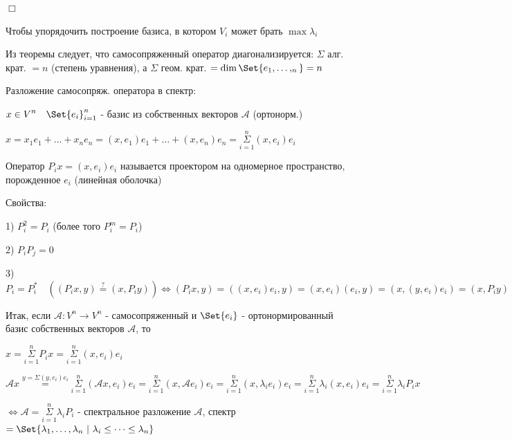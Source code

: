 \documentclass[12pt]{article}
\begin{document}
    $\Box$

    \Nota Чтобы упорядочить построение базиса, в котором $\displaystyle V_i$ может брать $\displaystyle \max \lambda_i$

    \Nota Из теоремы следует, что самосопряженный оператор диагонализируется: $\Sigma$ алг. крат. $ = n$ (степень уравнения), а $\Sigma$ геом. крат. $\displaystyle = \dim \Set{e_1, \dots, _n} = n$


    Разложение самосопряж. оператора в спектр:

    $\displaystyle x \in V^n \quad \Set{e_i}_{i=1}^n$ - базис из собственных векторов $\mathcal{A}$ (ортонорм.)

    $\displaystyle x = x_1 e_1 + \dots + x_n e_n = (x, e_1) e_1 + \dots + (x, e_n) e_n = \overset{n}{\underset{i = 1}{\Sigma}} (x, e_i) e_i$

    \Def Оператор $\displaystyle P_i x = (x, e_i) e_i$ называется проектором на одномерное пространство, порожденное $\displaystyle e_i$ (линейная оболочка)

    Свойства:

    1) $\displaystyle P_i^2 = P_i$ (более того $\displaystyle P^m_i = P_i$)

    2) $\displaystyle P_i P_j = 0$

    3) $\displaystyle P_i = P_i^* \quad ((P_i x, y) \stackrel{?}{=} (x, P_i y)) \Longleftrightarrow (P_i x, y) = ((x, e_i) e_i, y) = (x, e_i) (e_i, y) = (x, (y, e_i) e_i) = (x, P_i y)$

    Итак, если $\displaystyle \mathcal{A}: V^n \to V^n$ - самосопряженный и $\displaystyle \Set{e_i}$ - ортонормированный базис собственных векторов $\mathcal{A}$, то

    $\displaystyle x = \overset{n}{\underset{i = 1}{\Sigma}} P_i x = \overset{n}{\underset{i = 1}{\Sigma}} (x, e_i) e_i$

    $\displaystyle \mathcal{A} x \stackrel{y = \Sigma (y, e_i) e_i}{=} \overset{n}{\underset{i = 1}{\Sigma}} (\mathcal{A}x, e_i) e_i =
    \overset{n}{\underset{i = 1}{\Sigma}} (x, \mathcal{A}e_i) e_i = \overset{n}{\underset{i = 1}{\Sigma}} (x, \lambda_i e_i) e_i =
    \overset{n}{\underset{i = 1}{\Sigma}} \lambda_i (x, e_i) e_i = \overset{n}{\underset{i = 1}{\Sigma}} \lambda_i P_i x$

    $\displaystyle \Longleftrightarrow \mathcal{A} = \overset{n}{\underset{i = 1}{\Sigma}} \lambda_i P_i$ - спектральное разложение $\mathcal{A}$,
    спектр $\displaystyle = \Set{\lambda_1, \dots, \lambda_n \ | \ \lambda_i \leq \dots \leq \lambda_n}$
\end{document}

